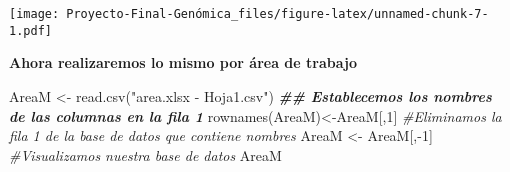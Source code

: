 \documentclass[
]{article}
\newenvironment{Shaded}{\begin{snugshade}}{\end{snugshade}}
\newcommand{\CommentTok}[1]{\textcolor[rgb]{0.56,0.35,0.01}{\textit{#1}}}
\newcommand{\DecValTok}[1]{\textcolor[rgb]{0.00,0.00,0.81}{#1}}
\newcommand{\DocumentationTok}[1]{\textcolor[rgb]{0.56,0.35,0.01}{\textbf{\textit{#1}}}}
\newcommand{\FunctionTok}[1]{\textcolor[rgb]{0.00,0.00,0.00}{#1}}
\newcommand{\NormalTok}[1]{#1}
\newcommand{\OtherTok}[1]{\textcolor[rgb]{0.56,0.35,0.01}{#1}}
\newcommand{\SpecialCharTok}[1]{\textcolor[rgb]{0.00,0.00,0.00}{#1}}
\newcommand{\StringTok}[1]{\textcolor[rgb]{0.31,0.60,0.02}{#1}}
\begin{document}
\texttt{[image: Proyecto-Final-Genómica\_files/figure-latex/unnamed-chunk-7-1.pdf]}

\textbf{Ahora realizaremos lo mismo por área de trabajo}

\begin{Shaded}
\begin{Highlighting}[]
\NormalTok{AreaM }\OtherTok{\textless{}{-}} \FunctionTok{read.csv}\NormalTok{(}\StringTok{"area.xlsx {-} Hoja1.csv"}\NormalTok{)}
\DocumentationTok{\#\# Establecemos los nombres de las columnas en la fila 1}
\FunctionTok{rownames}\NormalTok{(AreaM)}\OtherTok{\textless{}{-}}\NormalTok{AreaM[,}\DecValTok{1}\NormalTok{]}
\CommentTok{\#Eliminamos la fila 1 de la base de datos que contiene nombres}
\NormalTok{AreaM }\OtherTok{\textless{}{-}}\NormalTok{ AreaM[,}\SpecialCharTok{{-}}\DecValTok{1}\NormalTok{]}
\CommentTok{\#Visualizamos nuestra base de datos}
\NormalTok{AreaM}
\end{Highlighting}
\end{Shaded}
\end{document}
